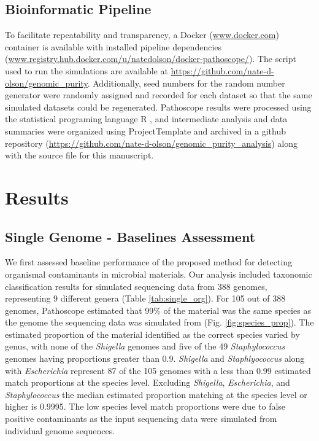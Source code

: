 \documentclass[fleqn,10pt,lineno]{wlpeerj}\usepackage[]{graphicx}\usepackage[]{color}
\begin{document}
\subsection*{Bioinformatic Pipeline}
To facilitate repeatability and transparency, a Docker (\url{www.docker.com}) container is available with installed pipeline dependencies (\url{www.registry.hub.docker.com/u/natedolson/docker-pathoscope/}).
The script used to run the simulations are available at \url{https://github.com/nate-d-olson/genomic_purity}.
Additionally, seed numbers for the random number generator were randomly assigned and recorded for each dataset so that the same simulated datasets could be regenerated.
Pathoscope results were processed using the statistical programing language R \citep{R}, and intermediate analysis and data summaries were organized using ProjectTemplate \citep{ProjectTemplate} and archived in a github repository (\url{https://github.com/nate-d-olson/genomic_purity_analysis}) along with the source file for this manuscript.

\section*{Results}

\subsection*{Single Genome - Baselines Assessment}
We first assessed baseline performance of the proposed method for detecting organismal contaminants in microbial materials. 
Our analysis included taxonomic classification results for simulated sequencing data  from 388 genomes, representing 9 different genera (Table \ref{tab:single_org}). 
For 105 out of 388 genomes, Pathoscope estimated that 99\% of the material was the same species as the genome the sequencing data was simulated from (Fig. \ref{fig:species_prop}). 
The estimated proportion of the material identified as the correct species varied by genus, with none of the \textit{Shigella} genomes and five of the 49 \textit{Staphylococcus} genomes having proportions greater than 0.9. \textit{Shigella} and \textit{Staphlyococcus} along with \textit{Escherichia} represent 87 of the 105 genomes with a less than 0.99 estimated match proportions at the species level. Excluding \textit{Shigella}, \textit{Escherichia}, and \textit{Staphylococcus} the median estimated proportion matching at the species level or higher is  0.9995. The low species level match proportions were due to false positive contaminants as the input sequencing data were simulated from individual genome sequences.
\end{document}
